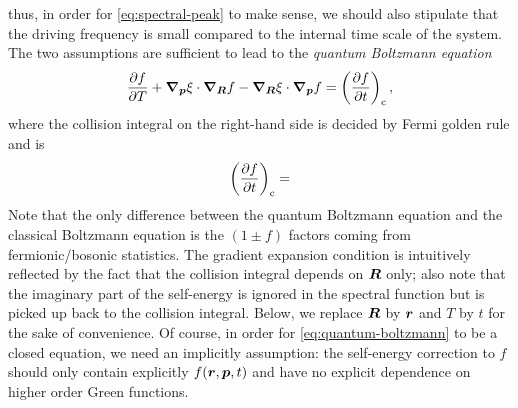 \documentclass[hyperref, a4paper]{article}
\begin{document}
thus, in order for \eqref{eq:spectral-peak} to make sense, 
we should also stipulate that the driving frequency 
is small compared to the internal time scale of the system.
The two assumptions are sufficient to lead to the \emph{quantum Boltzmann equation}
\begin{equation}
    \pdv{f}{T} + \grad_{\vb*{p}} \xi \cdot \grad_{\vb*{R}} f 
    - \grad_{\vb*{R}} \xi \cdot \grad_{\vb*{p}} f 
    = \left(\pdv{f}{t}\right)_{\text{c}}, 
    \label{eq:quantum-boltzmann}
\end{equation}
where the collision integral on the right-hand side is decided by Fermi golden rule 
and is 
\begin{equation}
    \left(\pdv{f}{t}\right)_{\text{c}} = 
\end{equation}
Note that the only difference between the quantum Boltzmann equation 
and the classical Boltzmann equation 
is the $(1 \pm f)$ factors coming from fermionic/bosonic statistics.
The gradient expansion condition is intuitively reflected 
by the fact that the collision integral depends on $\vb*{R}$ only;
also note that the imaginary part of the self-energy is ignored 
in the spectral function
but is picked up back to the collision integral.
Below, we replace $\vb*{R}$ by $\vb*{r}$ 
and $T$ by $t$
for the sake of convenience.
Of course, in order for \eqref{eq:quantum-boltzmann} to be a closed equation,
we need an implicitly assumption:
the self-energy correction to $f$ should only contain explicitly $f(\vb*{r}, \vb*{p}, t)$
and have no explicit dependence on higher order Green functions.
\end{document}
